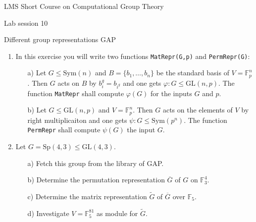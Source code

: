 \documentclass[12pt]{article}
\newcommand{\GAP}{\textsf{GAP}}
\newcommand{\GL}{\mathrm{GL}}
\newcommand{\Sp}{\mathrm{Sp}}
\newcommand{\ol}{\overline}
\newcommand{\ti}{\tilde}
\newcommand{\F}{\mathbb{F}}
\begin{document}
\begin{center}
\large LMS Short Course on Computational Group Theory

\Large Lab session 10

\large Different group representations \GAP
\end{center}

\begin{enumerate} 
\item In this exercise you will write two functions \texttt{MatRepr(G,p)}
and \texttt{PermRepr(G)}:
\begin{itemize}
\item[a)]
Let $G \le \mathrm{Sym}(n)$ and $B = \{ b_1, \ldots, b_n\}$ be the
standard basis of $V = \F_p^n$. Then $G$ acts on $B$ by $b_i^g =
b_{i^g}$ and one gets $\varphi : G \le \GL(n,p)$. The function
\texttt{MatRepr} shall compute $\varphi(G)$ for the inputs $G$ and $p$.
\item[b)]
Let $G \le \GL(n,p)$ and $V = \F_p^n$. Then $G$ acts on the elements
of $V$ by right multiplicaiton and one gets
$\psi : G \le \mathrm{Sym}(p^n)$. The function \texttt{PermRepr} shall 
compute $\psi(G)$ the input $G$.
\end{itemize}

\item 
Let $G = \Sp(4,3) \le \GL(4,3)$.
\begin{itemize}
\item[a)]
Fetch this group from the library of \GAP.
\item[b)]
Determine the permutation representation $\ol{G}$ of $G$ on $\F_3^4$.
\item[c)]
Determine the matrix representation $\ti{G}$ of $\overline{G}$ over
$\F_5$.
\item[d)]
Investigate $V = \F_5^{81}$ as module for $\ti{G}$.
\end{itemize}


\end{enumerate}
\end{document}
